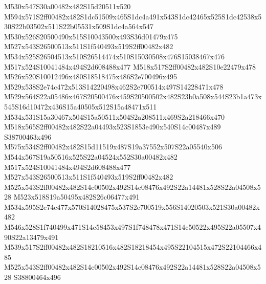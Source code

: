\documentclass{article}
\begin{document}
\begin{multicols}{2}

M530x547S30a00482x482S15d20511x520 M594x571S2ff00482x482S1dc51509x465S1dc4a491x543S1dc42465x525S1dc42538x530S22b03502x511S22b05531x509S1dc4a564x547 M530x526S20500490x515S10043500x493S36d01479x475 M527x543S26500513x511S1f540493x519S2ff00482x482 M534x525S26504513x510S26514474x510S15030508x476S15038467x476 M517x524S10041484x494S2d608488x477 M518x517S2ff00482x482S10e22479x478 M526x520S10012496x480S18518475x486S2e700496x495 M529x538S2e74c472x513S14220498x462S2e700514x497S14228471x478 M529x564S22a05486x467S20500476x459S20500502x482S23b0a508x544S23b1a473x545S16d10472x436S15a40505x512S15a48471x511 M534x531S15a30467x504S15a50511x504S2a208511x469S2a218466x470 M518x565S2ff00482x482S22a04493x523S1853e490x540S14c00487x489 S38700463x496 M575x534S2ff00482x482S15d11519x487S19a37552x507S22a05540x506 M544x567S19a50516x525S22a04524x552S30a00482x482 M517x524S10041484x494S2d608488x477 M527x543S26500513x511S1f540493x519S2ff00482x482 M525x543S2ff00482x482S14c00502x492S14c08476x492S22a14481x528S22a04508x528 M523x518S19a50495x482S26c06477x491 M534x595S2e74c477x570S14028475x537S2e700519x556S14020503x521S30a00482x482 M546x528S1f740499x471S14c58453x497S1f748478x471S14c50522x495S22a05507x490S22a13479x491 M539x517S2ff00482x482S18210516x482S18218454x495S22104515x472S22104466x485 M525x543S2ff00482x482S14c00502x492S14c08476x492S22a14481x528S22a04508x528 S38800464x496


\end{multicols}
\end{document}
